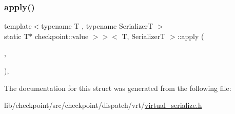 \subsubsection{\texorpdfstring{apply()}{apply()}}
{\footnotesize\ttfamily template$<$typename T , typename SerializerT $>$ \\
static T$\ast$ checkpoint\+::value $>$$>$$<$ T, SerializerT $>$\+::apply (\begin{DoxyParamCaption}\item[{SerializerT \&}]{,  }\item[{\hyperlink{namespacecheckpoint_1_1dispatch_1_1vrt_acd3f9e6b091bcfbc23dc35ea8ef45d3b}{dispatch\+::vrt\+::\+Type\+Idx}}]{ }\end{DoxyParamCaption})\hspace{0.3cm}{\ttfamily [inline]}, {\ttfamily [static]}}



The documentation for this struct was generated from the following file\+:\begin{DoxyCompactItemize}
\item 
lib/checkpoint/src/checkpoint/dispatch/vrt/\hyperlink{virtual__serialize_8h}{virtual\+\_\+serialize.\+h}\end{DoxyCompactItemize}

